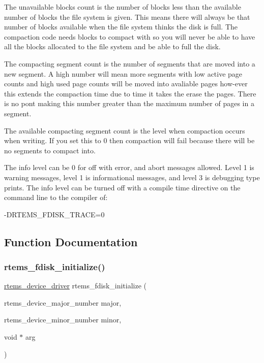 The unavailable blocks count is the number of blocks less than the available number of blocks the file system is given. This means there will always be that number of blocks available when the file system thinks the disk is full. The compaction code needs blocks to compact with so you will never be able to have all the blocks allocated to the file system and be able to full the disk.

The compacting segment count is the number of segments that are moved into a new segment. A high number will mean more segments with low active page counts and high used page counts will be moved into avaliable pages how-\/ever this extends the compaction time due to time it takes the erase the pages. There is no pont making this number greater than the maximum number of pages in a segment.

The available compacting segment count is the level when compaction occurs when writing. If you set this to 0 then compaction will fail because there will be no segments to compact into.

The info level can be 0 for off with error, and abort messages allowed. Level 1 is warning messages, level 1 is informational messages, and level 3 is debugging type prints. The info level can be turned off with a compile time directive on the command line to the compiler of\+: \begin{DoxyVerb}-DRTEMS_FDISK_TRACE=0
\end{DoxyVerb}
 

\subsection{Function Documentation}
\mbox{\label{group__RTEMSFDisk_ga38fc68a069082118de0f8b389fcd004b}} 
\subsubsection{\texorpdfstring{rtems\_fdisk\_initialize()}{rtems\_fdisk\_initialize()}}
{\footnotesize\ttfamily \mbox{\hyperlink{group__ClassicStatus_ga545d41846817eaba6143d52ee4d9e9fe}{rtems\+\_\+device\+\_\+driver}} rtems\+\_\+fdisk\+\_\+initialize (\begin{DoxyParamCaption}\item[{rtems\+\_\+device\+\_\+major\+\_\+number}]{major,  }\item[{rtems\+\_\+device\+\_\+minor\+\_\+number}]{minor,  }\item[{void $\ast$}]{arg }\end{DoxyParamCaption})}

